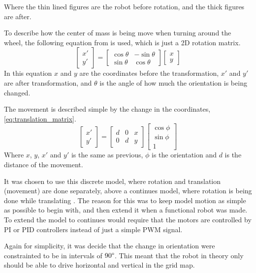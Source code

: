 \documentclass[Main]{subfiles}
\begin{document}
Where the thin lined figures are the robot before rotation, and the thick figures are after.

To describe how the center of mass is being move when turning around the wheel, the following equation from \citep{Wikipedia2015} is used, which is just a 2D rotation matrix.
\begin{equation}
\begin{bmatrix} x' \\ y' \end{bmatrix} = \begin{bmatrix} \cos{\theta} & -\sin{\theta} \\ \sin{\theta} & \cos{\theta} \end{bmatrix} \begin{bmatrix} x \\ y \end{bmatrix}
\end{equation}
In this equation $x$ and $y$ are the coordinates before the transformation, $x'$ and $y'$ are after transformation, and $\theta$ is the angle of how much the orientation is being changed.

The movement is described simple by the change in the coordinates, \autoref{eq:translation_matrix}.
\begin{equation}
\label{eq:translation_matrix}
\begin{bmatrix} x' \\ y' \end{bmatrix} = \begin{bmatrix}  d & 0 & x \\ 0 & d & y \end{bmatrix} \begin{bmatrix} \cos{\phi} \\ \sin{\phi} \\ 1 \end{bmatrix} 		
\end{equation}
Where $x$, $y$, $x'$ and $y'$ is the same as previous, $\phi$ is the orientation and $d$ is the distance of the movement.

It was chosen to use this discrete model, where rotation and translation (movement) are done separately, above a continues model, where rotation is being done while translating .
The reason for this was to keep model motion as simple as possible to begin with, and then extend it when a functional robot was made.
To extend the model to continues would require that the motors are controlled by PI or PID controllers instead of just a simple PWM signal.

Again for simplicity, it was decide that the change in orientation were constrainted to be in intervals of $90\degree$.
This meant that the robot in theory only should be able to drive horizontal and vertical in the grid map. 


\end{document}
